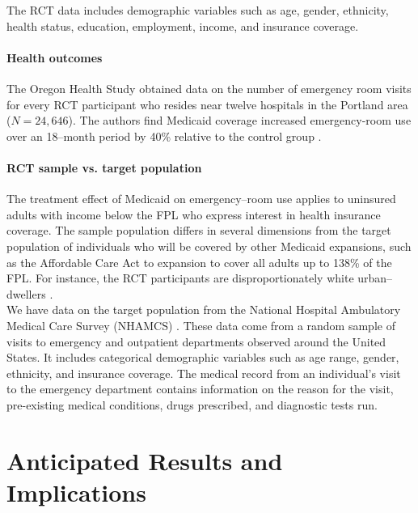\documentclass{article}
\begin{document}
The RCT data includes demographic variables such as age, gender, ethnicity, health status, education, employment, income, and insurance coverage. 

\paragraph{Health outcomes} 

The Oregon Health Study obtained data on the number of emergency room visits for every RCT participant who resides near twelve hospitals in the Portland area ($N=24,646$). The authors find Medicaid coverage increased emergency-room use over an 18--month period by 40\% relative to the control group \cite{Taubman}. 
 
\paragraph{RCT sample vs. target population}

The treatment effect of Medicaid on emergency--room use applies to uninsured adults with income below the FPL who express interest in health insurance coverage. The sample population differs in several dimensions from the target population of individuals who will be covered by other Medicaid expansions, such as the Affordable Care Act to expansion to cover all adults up to 138\% of the FPL. For instance, the RCT participants are disproportionately white urban--dwellers \cite{Taubman}. \\
 
We have data on the target population from the National Hospital Ambulatory Medical Care Survey (NHAMCS) \cite{NHAMCS}.  These data come from a random sample of visits to emergency and outpatient departments observed around the United States.  It includes categorical demographic variables such as age range, gender, ethnicity, and insurance coverage.  The medical record from an individual's visit to the emergency department contains information on the reason for the visit, pre-existing medical conditions, drugs prescribed, and diagnostic tests run. %

\section{Anticipated Results and Implications}




\end{document}
